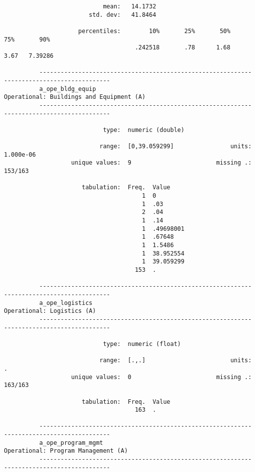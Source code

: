 \documentclass{article}
\begin{document}
\begin{verbatim}
                            mean:   14.1732
                        std. dev:   41.8464
          
                     percentiles:        10%       25%       50%       75%       90%
                                     .242518       .78      1.68      3.67   7.39286
          
          ------------------------------------------------------------------------------------------
          a_ope_bldg_equip                                  Operational: Buildings and Equipment (A)
          ------------------------------------------------------------------------------------------
          
                            type:  numeric (double)
          
                           range:  [0,39.059299]                units:  1.000e-06
                   unique values:  9                        missing .:  153/163
          
                      tabulation:  Freq.  Value
                                       1  0
                                       1  .03
                                       2  .04
                                       1  .14
                                       1  .49698001
                                       1  .67648
                                       1  1.5486
                                       1  38.952554
                                       1  39.059299
                                     153  .
          
          ------------------------------------------------------------------------------------------
          a_ope_logistics                                                 Operational: Logistics (A)
          ------------------------------------------------------------------------------------------
          
                            type:  numeric (float)
          
                           range:  [.,.]                        units:  .
                   unique values:  0                        missing .:  163/163
          
                      tabulation:  Freq.  Value
                                     163  .
          
          ------------------------------------------------------------------------------------------
          a_ope_program_mgmt                                     Operational: Program Management (A)
          ------------------------------------------------------------------------------------------
          

\end{verbatim}
\end{document}
